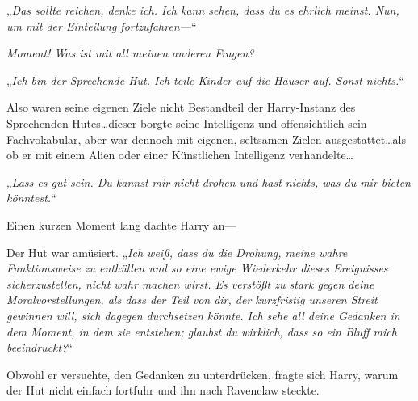 „\emph{Das sollte reichen, denke ich. Ich kann sehen, dass du es ehrlich meinst. Nun, um mit der Einteilung fortzufahren—}“

\emph{Moment! Was ist mit all meinen anderen Fragen?}

„\emph{Ich bin der Sprechende Hut. Ich teile Kinder auf die Häuser auf. Sonst nichts.}“

Also waren seine eigenen Ziele nicht Bestandteil der Harry-Instanz des Sprechenden Hutes…dieser borgte seine Intelligenz und offensichtlich sein Fachvokabular, aber war dennoch mit eigenen, seltsamen Zielen ausgestattet…als ob er mit einem Alien oder einer Künstlichen Intelligenz verhandelte…

„\emph{Lass es gut sein. Du kannst mir nicht drohen und hast nichts, was du mir bieten könntest.}“

Einen kurzen Moment lang dachte Harry an—

Der Hut war amüsiert. „\emph{Ich weiß, dass du die Drohung, meine wahre Funktionsweise zu enthüllen und so eine ewige Wiederkehr dieses Ereignisses sicherzustellen, nicht wahr machen wirst. Es verstößt zu stark gegen deine Moralvorstellungen, als dass der Teil von dir, der kurzfristig unseren Streit gewinnen will, sich dagegen durchsetzen könnte. Ich sehe all deine Gedanken in dem Moment, in dem sie entstehen; glaubst du wirklich, dass so ein Bluff mich beeindruckt?}“

Obwohl er versuchte, den Gedanken zu unterdrücken, fragte sich Harry, warum der Hut nicht einfach fortfuhr und ihn nach Ravenclaw steckte.

